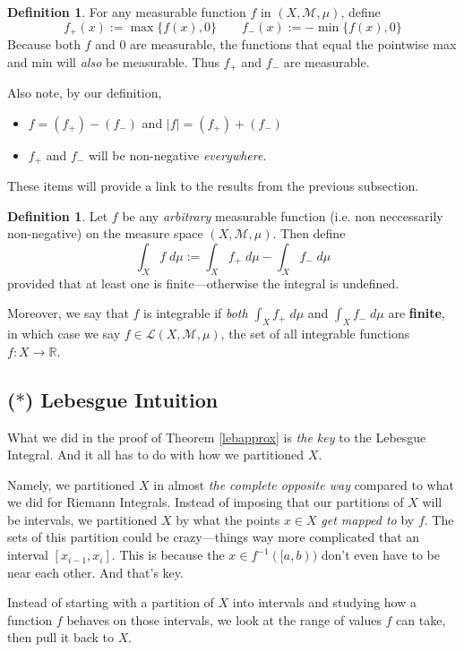 \documentclass[12pt]{article}
\theoremstyle{plain}
\theoremstyle{definition}
\newtheorem{defn}[thm]{Definition}
\theoremstyle{remark}
\begin{document}
\begin{defn}
For any measurable function $f$ in $(X,\mathscr{M},\mu)$, define
\[
    f_+(x) := \max\{f(x), 0\}
    \qquad
    f_-(x) := -\min\{f(x), 0\}
\]
Because both $f$ and $0$ are measurable, the functions that equal the pointwise max and min will \emph{also} be measurable. Thus $f_+$ and $f_-$ are measurable.

Also note, by our definition, 
\begin{itemize}
    \item $f = (f_+) - (f_-)$ and $|f| = (f_+) + (f_-)$
    \item $f_+$ and $f_-$ will be non-negative \emph{everywhere}.  
\end{itemize}
These items will provide a link to the results from the previous subsection.
\end{defn}

\begin{defn}
Let $f$ be any \emph{arbitrary} measurable function (i.e. non neccessarily non-negative) on the measure space $(X,\mathscr{M},\mu)$. Then define 
\[
    \int_X f\; d\mu := \int_X f_+ \; d\mu - \int_X f_- \; d\mu
\]
provided that at least one is finite---otherwise the integral is undefined.

Moreover, we say that $f$ is integrable if \emph{both} $\int_X f_+ \; d\mu$ and $\int_X f_- \; d\mu$ are \textbf{finite}, in which case we say $f\in\mathscr{L}(X,\mathscr{M},\mu)$, the set of all integrable functions $f:X\rightarrow\mathbb{R}$.
\end{defn}


\subsection{($*$) Lebesgue Intuition}

What we did in the proof of Theorem \ref{lebapprox} is \emph{the key} to the Lebesgue Integral.  And it all has to do with how we partitioned $X$.

Namely, we partitioned $X$ in almost \emph{the complete opposite way} compared to what we did for Riemann Integrals. Instead of imposing that our partitions of $X$ will be intervals, we partitioned $X$ by what the points $x\in X$ \emph{get mapped to} by $f$. The sets of this partition could be crazy---things way more complicated that an interval $[x_{i-1}, x_i]$. This is because the $x\in f^{-1}([a,b))$ don't even have to be near each other. And that's key.

Instead of starting with a partition of $X$ into intervals and studying how a function $f$ behaves on those intervals, we look at the range of values $f$ can take, then pull it back to $X$.
\end{document}
